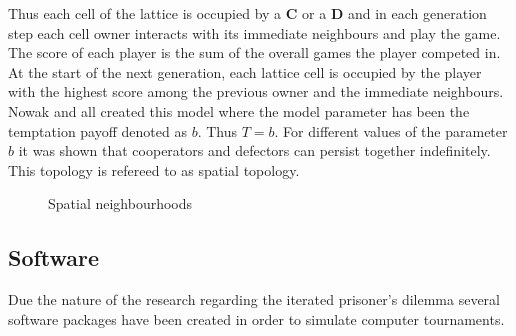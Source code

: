 \documentclass{article}
\begin{document}
Thus each cell of the lattice is occupied by a \textbf{C} or a \textbf{D} and in
each generation step each cell owner interacts with its immediate neighbours and
play the game. The score of each player is the sum of the overall games the player
competed in. At the start of the next generation, each lattice cell is occupied by the
player with the highest score among the previous owner and the immediate
neighbours. Nowak and all created this model where the model parameter
has been the temptation payoff denoted as \(b\). Thus \(T=b\). For 
different values of the parameter \(b\) it was shown that cooperators and
defectors can persist together indefinitely. This topology is refereed to as
spatial topology.

\begin{figure}[!hbtp]
\centering
    \begin{subfigure}{.25\textwidth}
            
    \end{subfigure}
    \begin{subfigure}{.25\textwidth}\centering
         
     \end{subfigure}
     \begin{subfigure}{.25\textwidth}\centering
         
     \end{subfigure}
    \begin{subfigure}{.25\textwidth}
            
    \end{subfigure}
    \begin{subfigure}{.25\textwidth}\centering
         
     \end{subfigure}
     \begin{subfigure}{.25\textwidth}\centering
         
     \end{subfigure}
     \caption{Spatial neighbourhoods}\label{fig:topologies}
    \end{figure}

\subsection{Software} 

Due the nature of the research regarding the iterated prisoner's dilemma
several software packages have been created in order to simulate computer
tournaments.
\end{document}
